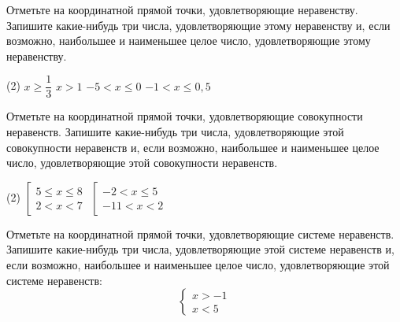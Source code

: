 \begin{homework}[number=1]
	\begin{listofex}
	\item Отметьте на координатной прямой точки, удовлетворяющие неравенству. Запишите какие-нибудь три числа, удовлетворяющие этому неравенству и, если возможно, наибольшее и наименьшее целое число, удовлетворяющие этому неравенству.
	\begin{tasks}(2)
		\task \( x \ge \dfrac{ 1 }{ 3 } \)
		\task \( x > 1 \)
		\task \( -5 < x \le 0 \)
		\task \( -1 < x \le 0,5 \)
	\end{tasks}
	
	
	\item Отметьте на координатной прямой точки, удовлетворяющие совокупности неравенств. Запишите какие-нибудь три числа, удовлетворяющие этой совокупности неравенств и, если возможно, наибольшее и наименьшее целое число, удовлетворяющие этой совокупности неравенств.
	\begin{tasks}(2)
		\task \( \left[
		\begin{array}{l} 5 \le x \le 8 \\ 2 < x < 7 \end{array} \right. \)
		\task \( \left[
		\begin{array}{l} -2<x \le 5 \\ -11 < x < 2 \end{array} \right. \)
	\end{tasks}
	\item Отметьте на координатной прямой точки, удовлетворяющие системе неравенств. Запишите какие-нибудь три числа, удовлетворяющие этой системе неравенств и, если возможно, наибольшее и наименьшее целое число, удовлетворяющие этой системе неравенств: \[ \begin{cases} x > -1 \\ x < 5 \end{cases} \]

\end{listofex}
\end{homework}
